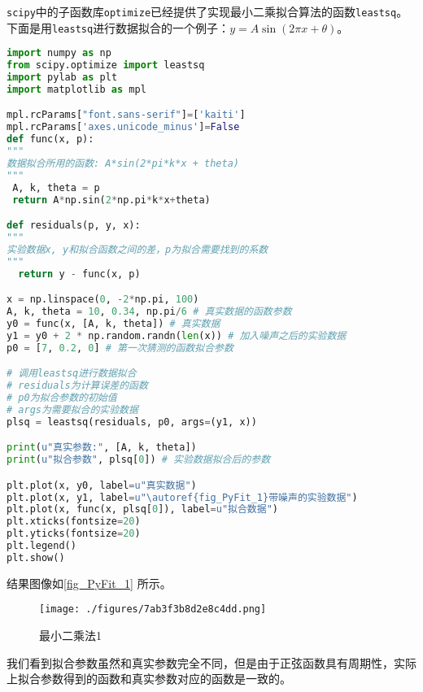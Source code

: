 \verb|scipy|中的子函数库\verb|optimize|已经提供了实现最小二乘拟合算法的函数\verb|leastsq|。下面是用\verb|leastsq|进行数据拟合的一个例子：$y=A\sin(2\pi x+\theta)$。
\begin{lstlisting}[language=python]
import numpy as np
from scipy.optimize import leastsq
import pylab as plt
import matplotlib as mpl

mpl.rcParams["font.sans-serif"]=['kaiti']
mpl.rcParams['axes.unicode_minus']=False
def func(x, p):
"""
数据拟合所用的函数: A*sin(2*pi*k*x + theta)
"""
 A, k, theta = p
 return A*np.sin(2*np.pi*k*x+theta)

def residuals(p, y, x):
"""
实验数据x, y和拟合函数之间的差，p为拟合需要找到的系数
"""
  return y - func(x, p)

x = np.linspace(0, -2*np.pi, 100)
A, k, theta = 10, 0.34, np.pi/6 # 真实数据的函数参数
y0 = func(x, [A, k, theta]) # 真实数据
y1 = y0 + 2 * np.random.randn(len(x)) # 加入噪声之后的实验数据
p0 = [7, 0.2, 0] # 第一次猜测的函数拟合参数

# 调用leastsq进行数据拟合
# residuals为计算误差的函数
# p0为拟合参数的初始值
# args为需要拟合的实验数据
plsq = leastsq(residuals, p0, args=(y1, x))

print(u"真实参数:", [A, k, theta])
print(u"拟合参数", plsq[0]) # 实验数据拟合后的参数

plt.plot(x, y0, label=u"真实数据")
plt.plot(x, y1, label=u"\autoref{fig_PyFit_1}带噪声的实验数据")
plt.plot(x, func(x, plsq[0]), label=u"拟合数据")
plt.xticks(fontsize=20)
plt.yticks(fontsize=20)
plt.legend()
plt.show()
\end{lstlisting}
结果图像如\autoref{fig_PyFit_1} 所示。
\begin{figure}[ht]
\centering
\texttt{[image: ./figures/7ab3f3b8d2e8c4dd.png]}
\caption{最小二乘法1} \label{fig_PyFit_1}
\end{figure}

我们看到拟合参数虽然和真实参数完全不同，但是由于正弦函数具有周期性，实际上拟合参数得到的函数和真实参数对应的函数是一致的。


